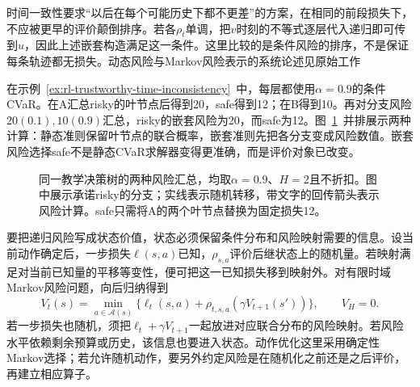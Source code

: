时间一致性要求“以后在每个可能历史下都不更差”的方案，在相同的前段损失下，不应被更早的评价颠倒排序。若各$\rho_t$单调，把$v$时刻的不等式逐层代入递归即可传到$u$，因此上述嵌套构造满足这一条件。这里比较的是条件风险的排序，不是保证每条轨迹都无损失。动态风险与Markov风险表示的系统论述见原始工作

在示例~\ref{ex:rl-trustworthy-time-inconsistency}~中，每层都使用$\alpha=0.9$的条件CVaR。在A汇总risky的叶节点后得到20，safe得到12；在B得到10。再对分支风险$20(0.1),10(0.9)$汇总，risky的嵌套风险为20，而safe为12。图~\ref{fig:rl-trustworthy-risk-tree}~并排展示两种计算：静态准则保留叶节点的联合概率，嵌套准则先把各分支变成风险数值。嵌套风险选择safe不是静态CVaR求解器变得更准确，而是评价对象已改变。

\begin{figure}[t]
  \centering
  
  \caption{同一教学决策树的两种风险汇总，均取$\alpha=0.9$、$H=2$且不折扣。图中展示承诺risky的分支；实线表示随机转移，带文字的回传箭头表示风险计算。safe只需将A的两个叶节点替换为固定损失12。}
  \label{fig:rl-trustworthy-risk-tree}
\end{figure}

要把递归风险写成状态价值，状态必须保留条件分布和风险映射需要的信息。设当前动作确定后，一步损失$\ell(s,a)$已知，$\rho_{s,a}$评价后继状态上的随机量。若映射满足对当前已知量的平移等变性，便可把这一已知损失移到映射外。对有限时域Markov风险问题，向后归纳得到
\begin{equation}
  V_t(s)=\min_{a\in\mathcal A(s)}
    \{\ell_t(s,a)+\rho_{t,s,a}(\gamma V_{t+1}(s'))\},
  \qquad V_H=0.
  \label{eq:rl-trustworthy-risk-bellman}
\end{equation}
若一步损失也随机，须把$\ell_t+\gamma V_{t+1}$一起放进对应联合分布的风险映射。若风险水平依赖剩余预算或历史，该信息也要进入状态。动作优化这里采用确定性Markov选择；若允许随机动作，要另外约定风险是在随机化之前还是之后评价，再建立相应算子。

